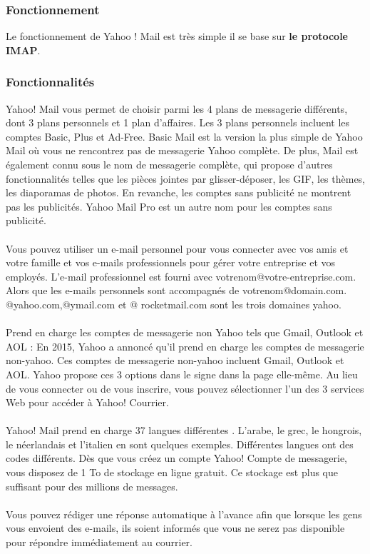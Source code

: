 \documentclass[french]{report}
\begin{document}
\begin{titlepage}
\subsubsection{\LARGE Fonctionnement}
\LARGE Le fonctionnement de Yahoo ! Mail est très simple il se base sur \textbf{le protocole IMAP}.
\subsubsection{\LARGE Fonctionnalités}
\LARGE Yahoo! Mail vous permet de choisir parmi les 4 plans de messagerie différents, dont 3 plans personnels et 1 plan d'affaires. Les 3 plans personnels incluent les comptes Basic, Plus et Ad-Free. Basic Mail est la version la plus simple de Yahoo Mail où vous ne rencontrez pas de messagerie Yahoo complète. De plus, Mail est également connu sous le nom de messagerie complète, qui propose d'autres fonctionnalités telles que les pièces jointes par glisser-déposer, les GIF, les thèmes, les diaporamas de photos. En revanche, les comptes sans publicité ne montrent pas les publicités. Yahoo Mail Pro est un autre nom pour les comptes sans publicité.\\ \\
Vous pouvez utiliser un e-mail personnel pour vous connecter avec vos amis et votre famille et vos e-mails professionnels pour gérer votre entreprise et vos employés. L'e-mail professionnel est fourni avec votrenom@votre-entreprise.com. Alors que les e-mails personnels sont accompagnés de votrenom@domain.com. @yahoo.com,@ymail.com et @ rocketmail.com sont les trois domaines yahoo.\\ \\
Prend en charge les comptes de messagerie non Yahoo tels que Gmail, Outlook et AOL :
En 2015, Yahoo a annoncé qu'il prend en charge les comptes de messagerie non-yahoo. Ces comptes de messagerie non-yahoo incluent Gmail, Outlook et AOL. Yahoo propose ces 3 options dans le signe dans la page elle-même. Au lieu de vous connecter ou de vous inscrire, vous pouvez sélectionner l'un des 3 services Web pour accéder à Yahoo! Courrier.\\ \\
Yahoo! Mail prend en charge 37 langues différentes . L'arabe, le grec, le hongrois, le néerlandais et l'italien en sont quelques exemples. Différentes langues ont des codes différents.
Dès que vous créez un compte Yahoo! Compte de messagerie, vous disposez de 1 To de stockage en ligne gratuit. Ce stockage est plus que suffisant pour des millions de messages.\\ \\
Vous pouvez rédiger une réponse automatique à l'avance afin que lorsque les gens vous envoient des e-mails, ils soient informés que vous ne serez pas disponible pour répondre immédiatement au courrier.
\newpage

\end{titlepage}
\end{document}
